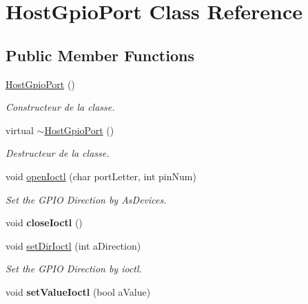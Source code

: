 \hypertarget{classHostGpioPort}{}\section{Host\+Gpio\+Port Class Reference}
\label{classHostGpioPort}
\subsection*{Public Member Functions}
\begin{DoxyCompactItemize}
\item 
\mbox{\label{classHostGpioPort_a304af87976a92b05e5b797a1b6b82b7a}} 
\hyperlink{classHostGpioPort_a304af87976a92b05e5b797a1b6b82b7a}{Host\+Gpio\+Port} ()
\begin{DoxyCompactList}\small\item\em Constructeur de la classe. \end{DoxyCompactList}\item 
\mbox{\label{classHostGpioPort_a4211eaa1c4b7f5539e567b7c1fb8aa10}} 
virtual \hyperlink{classHostGpioPort_a4211eaa1c4b7f5539e567b7c1fb8aa10}{$\sim$\+Host\+Gpio\+Port} ()
\begin{DoxyCompactList}\small\item\em Destructeur de la classe. \end{DoxyCompactList}\item 
void \hyperlink{classHostGpioPort_a470f2d24f0f75d05fdc769db97af7a5b}{open\+Ioctl} (char port\+Letter, int pin\+Num)
\begin{DoxyCompactList}\small\item\em Set the G\+P\+IO Direction by As\+Devices. \end{DoxyCompactList}\item 
\mbox{\label{classHostGpioPort_aeae314645b2503fb6301f366b0d4d981}} 
void {\bfseries close\+Ioctl} ()
\item 
void \hyperlink{classHostGpioPort_a0c7cf6d4131e5aa2bfa88c85c169f856}{set\+Dir\+Ioctl} (int a\+Direction)
\begin{DoxyCompactList}\small\item\em Set the G\+P\+IO Direction by ioctl. \end{DoxyCompactList}\item 
\mbox{\label{classHostGpioPort_a179119a05024468da25cfe29e982dcbb}} 
void {\bfseries set\+Value\+Ioctl} (bool a\+Value)
\end{DoxyCompactItemize}


